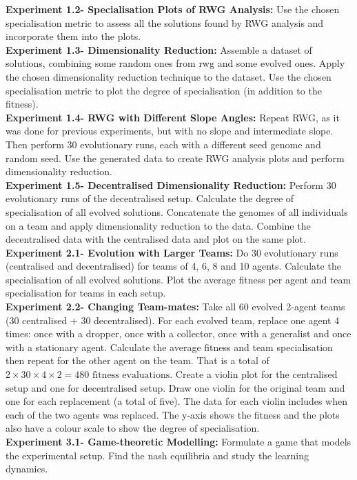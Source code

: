 \documentclass[12pt]{article}
\begin{document}
\textbf{Experiment 1.2- Specialisation Plots of RWG Analysis:}  Use the chosen specialisation metric to assess all the solutions found by RWG analysis and incorporate them into the plots.\\

\textbf{Experiment 1.3- Dimensionality Reduction:} Assemble a dataset of solutions, combining some random ones from rwg and some evolved ones.
Apply the chosen dimensionality reduction technique to the dataset.
Use the chosen specialisation metric to plot the degree of specialisation (in addition to the fitness).\\

\textbf{Experiment 1.4- RWG with Different Slope Angles:} Repeat RWG, as it was done for previous experiments, but with no slope and intermediate slope.
Then perform 30 evolutionary runs, each with a different seed genome and random seed.
Use the generated data to create RWG analysis plots and perform dimensionality reduction.\\

\textbf{Experiment 1.5- Decentralised Dimensionality Reduction:} Perform 30 evolutionary runs of the decentralised setup.
Calculate the degree of specialisation of all evolved solutions.
Concatenate the genomes of all individuals on a team and apply dimensionality reduction to the data.
Combine the decentralised data with the centralised data and plot on the same plot.\\

\textbf{Experiment 2.1- Evolution with Larger Teams:} Do 30 evolutionary runs (centralised and decentralised) for teams of 4, 6, 8 and 10 agents.
Calculate the specialisation of all evolved solutions.
Plot the average fitness per agent and team specialisation for teams in each setup. \\

\textbf{Experiment 2.2- Changing Team-mates:} Take all 60 evolved 2-agent teams (30 centralised + 30 decentralised).
For each evolved team, replace one agent 4 times: once with a dropper, once with a collector, once with a generalist and once with a stationary agent.
Calculate the average fitness and team specialisation then repeat for the other agent on the team.
That is a total of $2 \times 30 \times 4 \times 2= 480 \mbox{ fitness evaluations}$. 
Create a violin plot for the centralised setup and one for decentralised setup.
Draw one violin for the original team and one for each replacement (a total of five).
The data for each violin includes when each of the two agents was replaced.
The y-axis shows the fitness and the plots also have a colour scale to show the degree of specialisation.\\

\textbf{Experiment 3.1- Game-theoretic Modelling:} Formulate a game that models the experimental setup. 
Find the nash equilibria and study the learning dynamics.\\
\end{document}
